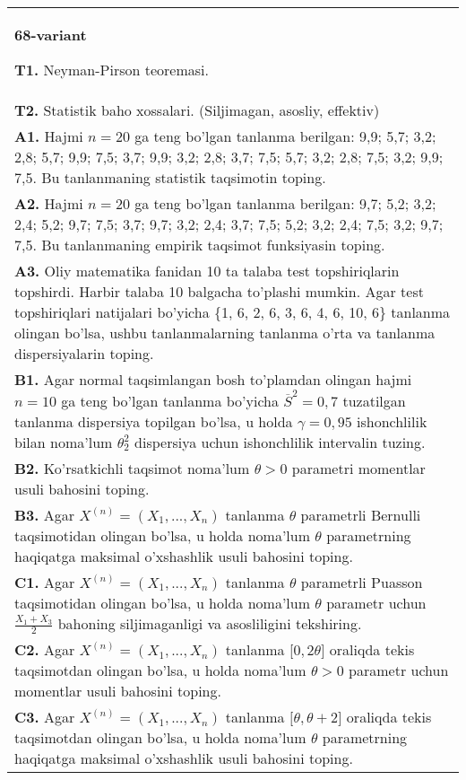 \documentclass{article}
\begin{document}
\begin{tabular}{m{17cm}}
\textbf{68-variant}
\newline

\textbf{T1.} 
Neyman-Pirson teoremasi.
\\
\textbf{T2.} 
Statistik baho xossalari. (Siljimagan, asosliy, effektiv)
\\
\textbf{A1.} 
Hajmi \(n = 20\) ga teng bo'lgan tanlanma berilgan: 9,9; 5,7; 3,2; 2,8; 5,7; 9,9; 7,5; 3,7; 9,9; 3,2; 2,8; 3,7; 7,5; 5,7; 3,2; 2,8; 7,5; 3,2; 9,9; 7,5. Bu tanlanmaning statistik taqsimotin toping.
\\
\textbf{A2.} 
Hajmi \(n = 20\) ga teng bo'lgan tanlanma berilgan: 9,7; 5,2; 3,2; 2,4; 5,2; 9,7; 7,5; 3,7; 9,7; 3,2; 2,4; 3,7; 7,5; 5,2; 3,2; 2,4; 7,5; 3,2; 9,7; 7,5. Bu tanlanmaning empirik taqsimot funksiyasin toping.
\\
\textbf{A3.} 
Oliy matematika fanidan 10 ta talaba test topshiriqlarin topshirdi. Harbir talaba 10 balgacha to'plashi mumkin. Agar test topshiriqlari natijalari bo'yicha \{1, 6, 2, 6, 3, 6, 4, 6, 10, 6\} tanlanma olingan bo'lsa, ushbu tanlanmalarning tanlanma o'rta va tanlanma dispersiyalarin toping.
\\
\textbf{B1.} 
Agar normal taqsimlangan bosh to'plamdan olingan hajmi \(n = 10\) ga teng bo'lgan tanlanma bo'yicha \({\overline{S}}^{2} = 0,7\) tuzatilgan tanlanma dispersiya topilgan bo'lsa, u holda \(\gamma = 0,95\) ishonchlilik bilan noma'lum \(\theta_{2}^{2}\) dispersiya uchun ishonchlilik intervalin tuzing.
\\
\textbf{B2.} 
Ko'rsatkichli taqsimot noma'lum \(\theta > 0\) parametri momentlar usuli bahosini toping.
\\
\textbf{B3.} 
Agar \(X^{(n)} = \left( X_{1},...,X_{n} \right)\) tanlanma \(\theta\) parametrli Bernulli taqsimotidan olingan bo'lsa, u holda noma'lum \(\theta\) parametrning haqiqatga maksimal o'xshashlik usuli bahosini toping.
\\
\textbf{C1.} 
Agar \(X^{(n)} = \left( X_{1},...,X_{n} \right)\) tanlanma \(\theta\) parametrli Puasson taqsimotidan olingan bo'lsa, u holda noma'lum \(\theta\) parametr uchun \(\frac{X_{1} + X_{3}}{2}\) bahoning siljimaganligi va asosliligini tekshiring.
\\
\textbf{C2.} 
Agar \(X^{(n)} = \left( X_{1},...,X_{n} \right)\) tanlanma {[}\(0,2\theta\rbrack\) oraliqda tekis taqsimotdan olingan bo'lsa, u holda noma'lum \(\theta > 0\) parametr uchun momentlar usuli bahosini toping.
\\
\textbf{C3.} 
Agar \(X^{(n)} = \left( X_{1},...,X_{n} \right)\) tanlanma \(\lbrack\theta,\theta + 2\rbrack\) oraliqda tekis taqsimotdan olingan bo'lsa, u holda noma'lum \(\theta\) parametrning haqiqatga maksimal o'xshashlik usuli bahosini toping.
\\

\end{tabular}
\vspace{1cm}
\end{document}
